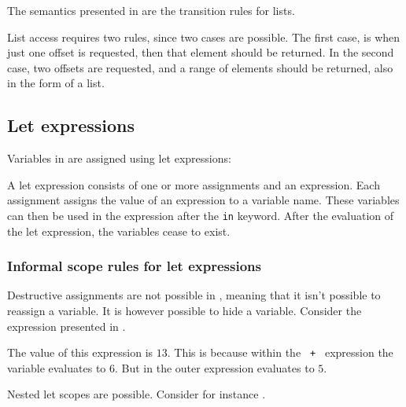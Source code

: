 The semantics presented in  are the transition rules
for lists.



List access requires two rules, since two cases are possible. The first case, is
when just one offset is requested, then that element should be returned. In the
second case, two offsets are requested, and a range of elements should be
returned, also in the form of a list.

\subsection{Let expressions}
\label{sec:letexpressions}

Variables in \productname{} are assigned using let expressions:

\begin{ebnf}
\end{ebnf}

A let expression consists of one or more assignments and an expression. Each
assignment assigns the value of an expression to a variable name. These
variables can then be used in the expression after the \texttt{in} keyword.
After the evaluation of the let expression, the variables cease to exist.

\subsubsection{Informal scope rules for let expressions}

Destructive assignments are not possible in \productname{}, meaning that it isn't
possible to reassign a variable. It is however possible to hide a variable.
Consider the expression presented in .


The value of this expression is $13$. This is because within the
\texttt{ + } expression the  variable evaluates to $6$.
But in the outer expression  evaluates to $5$.

Nested let scopes are possible. Consider for instance .


